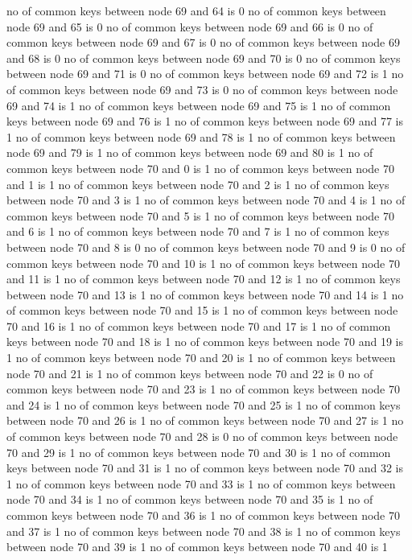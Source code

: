 no of common keys between node 69 and 64 is 0
no of common keys between node 69 and 65 is 0
no of common keys between node 69 and 66 is 0
no of common keys between node 69 and 67 is 0
no of common keys between node 69 and 68 is 0
no of common keys between node 69 and 70 is 0
no of common keys between node 69 and 71 is 0
no of common keys between node 69 and 72 is 1
no of common keys between node 69 and 73 is 0
no of common keys between node 69 and 74 is 1
no of common keys between node 69 and 75 is 1
no of common keys between node 69 and 76 is 1
no of common keys between node 69 and 77 is 1
no of common keys between node 69 and 78 is 1
no of common keys between node 69 and 79 is 1
no of common keys between node 69 and 80 is 1
no of common keys between node 70 and 0 is 1
no of common keys between node 70 and 1 is 1
no of common keys between node 70 and 2 is 1
no of common keys between node 70 and 3 is 1
no of common keys between node 70 and 4 is 1
no of common keys between node 70 and 5 is 1
no of common keys between node 70 and 6 is 1
no of common keys between node 70 and 7 is 1
no of common keys between node 70 and 8 is 0
no of common keys between node 70 and 9 is 0
no of common keys between node 70 and 10 is 1
no of common keys between node 70 and 11 is 1
no of common keys between node 70 and 12 is 1
no of common keys between node 70 and 13 is 1
no of common keys between node 70 and 14 is 1
no of common keys between node 70 and 15 is 1
no of common keys between node 70 and 16 is 1
no of common keys between node 70 and 17 is 1
no of common keys between node 70 and 18 is 1
no of common keys between node 70 and 19 is 1
no of common keys between node 70 and 20 is 1
no of common keys between node 70 and 21 is 1
no of common keys between node 70 and 22 is 0
no of common keys between node 70 and 23 is 1
no of common keys between node 70 and 24 is 1
no of common keys between node 70 and 25 is 1
no of common keys between node 70 and 26 is 1
no of common keys between node 70 and 27 is 1
no of common keys between node 70 and 28 is 0
no of common keys between node 70 and 29 is 1
no of common keys between node 70 and 30 is 1
no of common keys between node 70 and 31 is 1
no of common keys between node 70 and 32 is 1
no of common keys between node 70 and 33 is 1
no of common keys between node 70 and 34 is 1
no of common keys between node 70 and 35 is 1
no of common keys between node 70 and 36 is 1
no of common keys between node 70 and 37 is 1
no of common keys between node 70 and 38 is 1
no of common keys between node 70 and 39 is 1
no of common keys between node 70 and 40 is 1
